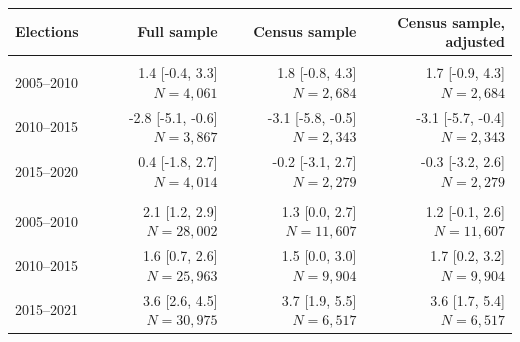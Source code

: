 
\begin{tabular}{lrrr}
\toprule
Elections & Full sample & Census sample & Census sample, adjusted\\
\midrule
\addlinespace[0.3em]
\multicolumn{4}{l}{\textbf{Rajasthan}}\\
\hspace{1em}2005--2010 & \shortstack{1.4 [-0.4, 3.3]\\$N=4,061$} & \shortstack{1.8 [-0.8, 4.3]\\$N=2,684$} & \shortstack{1.7 [-0.9, 4.3]\\$N=2,684$}\\
\hspace{1em}2010--2015 & \shortstack{-2.8 [-5.1, -0.6]\\$N=3,867$} & \shortstack{-3.1 [-5.8, -0.5]\\$N=2,343$} & \shortstack{-3.1 [-5.7, -0.4]\\$N=2,343$}\\
\hspace{1em}2015--2020 & \shortstack{0.4 [-1.8, 2.7]\\$N=4,014$} & \shortstack{-0.2 [-3.1, 2.7]\\$N=2,279$} & \shortstack{-0.3 [-3.2, 2.6]\\$N=2,279$}\\
\addlinespace[0.3em]
\multicolumn{4}{l}{\textbf{Uttar Pradesh}}\\
\hspace{1em}2005--2010 & \shortstack{2.1 [1.2, 2.9]\\$N=28,002$} & \shortstack{1.3 [0.0, 2.7]\\$N=11,607$} & \shortstack{1.2 [-0.1, 2.6]\\$N=11,607$}\\
\hspace{1em}2010--2015 & \shortstack{1.6 [0.7, 2.6]\\$N=25,963$} & \shortstack{1.5 [0.0, 3.0]\\$N=9,904$} & \shortstack{1.7 [0.2, 3.2]\\$N=9,904$}\\
\hspace{1em}2015--2021 & \shortstack{3.6 [2.6, 4.5]\\$N=30,975$} & \shortstack{3.7 [1.9, 5.5]\\$N=6,517$} & \shortstack{3.6 [1.7, 5.4]\\$N=6,517$}\\
\bottomrule
\end{tabular}
